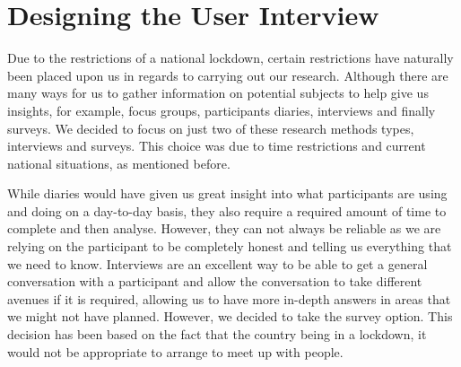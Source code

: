 \documentclass{sigchi}
\begin{document}


\section{Designing the User Interview}


	
	Due to the restrictions of a national lockdown, certain restrictions have naturally been placed upon us in regards to carrying out our research. Although there are many ways for us to gather information on potential subjects to help give us insights, for example, focus groups, participants diaries, interviews and finally surveys. We decided to focus on just two of these research methods types, interviews and surveys. This choice was due to time restrictions and current national situations, as mentioned before. 
	
	While diaries would have given us great insight into what participants are using and doing on a day-to-day basis, they also require a required amount of time to complete and then analyse. However, they can not always be reliable as we are relying on the participant to be completely honest and telling us everything that we need to know. Interviews are an excellent way to be able to get a general conversation with a participant and allow the conversation to take different avenues if it is required, allowing us to have more in-depth answers in areas that we might not have planned. However, we decided to take the survey option. This decision has been based on the fact that the country being in a lockdown, it would not be appropriate to arrange to meet up with people.
	
\end{document}
